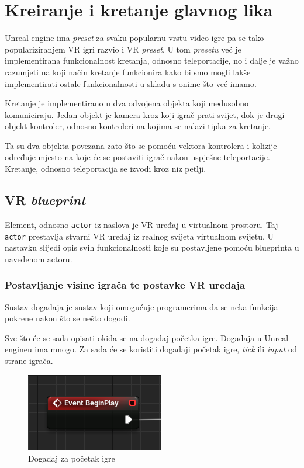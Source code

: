 \documentclass[a4paper,10pt]{article}
\begin{document}
\pagebreak
\section{Kreiranje i kretanje glavnog lika}
 

Unreal engine ima \textit{preset} za svaku popularnu vrstu video igre pa se
tako populariziranjem VR igri razvio i VR \textit{preset}. U tom
\textit{presetu} već je implementirana funkcionalnost kretanja, odnosno
teleportacije, no i dalje je važno razumjeti na koji način kretanje funkcionira
kako bi smo mogli lakše implementirati ostale funkcionalnosti u skladu s onime
što već imamo.

Kretanje je implementirano u dva odvojena objekta koji međusobno komuniciraju.
Jedan objekt je kamera kroz koji igrač prati svijet, dok je drugi objekt
kontroler, odnosno kontroleri na kojima se nalazi tipka za kretanje.

Ta su dva objekta povezana zato što se pomoću vektora kontrolera i kolizije
određuje mjesto na koje će se postaviti igrač nakon uspješne teleportacije.
Kretanje, odnosno teleportacija se izvodi kroz niz petlji.

\subsection{VR \textit{blueprint}}

Element, odnosno \texttt{actor} iz naslova je VR uređaj u virtualnom prostoru.
Taj \texttt{actor} prestavlja stvarni VR uređaj iz realnog svijeta virtualnom
svijetu. U nastavku slijedi opis svih funkcionalnosti koje su postavljene
pomoću blueprinta u navedenom actoru.

\subsubsection{Postavljanje visine igrača te postavke VR uređaja}
   

Sustav događaja je sustav koji omogućuje programerima da se neka funkcija
pokrene nakon što se nešto dogodi.

Sve što će se sada opisati okida se na događaj početka igre. Događaja  u Unreal
engineu ima mnogo. Za sada će se koristiti događaji početak igre, \textit{tick}
ili \textit{input} od strane igrača.

\begin{figure}[!h]
	\centering
	\includegraphics[]{slike/01.png}
	\caption{Događaj za početak igre}
\end{figure}
\end{document}
